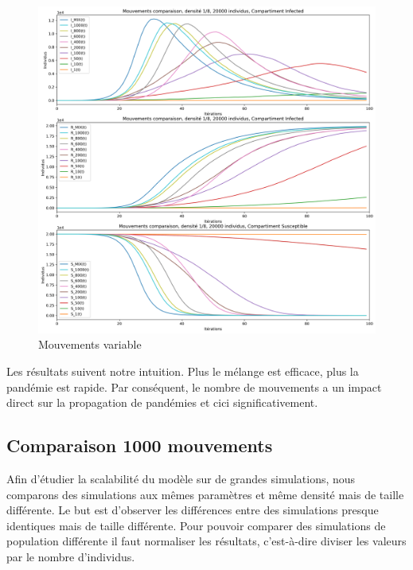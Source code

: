 \begin{figure}[h]
	\centering
	\captionsetup{justification=centering}
	\includegraphics[width=.7\textwidth]{Images/SIR_mouvements_variables.png}
	\caption{Mouvements variable}
\end{figure}

Les résultats suivent notre intuition. Plus le mélange est efficace, plus la pandémie est rapide. Par conséquent, le nombre de mouvements a un impact direct sur la propagation de pandémies et cici significativement. 

\newpage

\subsection{Comparaison 1000 mouvements}

Afin d'étudier la scalabilité du modèle sur de grandes simulations, nous comparons des simulations aux mêmes paramètres et même densité mais de taille différente. Le but est d'observer les différences entre des simulations presque identiques mais de taille différente. Pour pouvoir comparer des simulations de population différente il faut normaliser les résultats, c'est-à-dire diviser les valeurs par le nombre d'individus.

